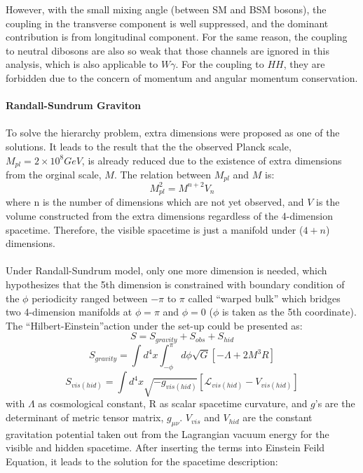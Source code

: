 However, with the small mixing angle (between SM and BSM bosons), the coupling in the transverse component is well suppressed, and the dominant contribution is from longitudinal component. For the same reason, the coupling to neutral dibosons are also so weak that those channels are ignored in this analysis, which is also applicable to $W\gamma$.  For the coupling to $HH$, they are forbidden due to the concern of momentum and angular momentum conservation. 
\\
\\{\bf Randall-Sundrum Graviton}
\\
\\To solve the hierarchy problem, extra dimensions were proposed as one of the solutions. It leads to the result that the the observed Planck scale, $M_{pl}=2\times10^8GeV$, is already reduced due to the existence of extra dimensions from the orginal scale, $M$. The relation between $M_{pl}$ and $M$ is: 
\begin{equation}
\label{Eq:planck_relation}
M_{pl}^{2} = M^{n+2}V_{n}
\end{equation}
where n is the number of dimensions which are not yet observed, and $V$ is the volume constructed from the extra dimensions regardless of the 4-dimension spacetime. Therefore, the visible spacetime is just a manifold under ($4+n$) dimensions.
\\ 
\\Under Randall-Sundrum model, only one more dimension is needed, which hypothesizes that the 5th dimension is constrained with boundary condition of the $\phi$ periodicity ranged between $-\pi$ to $\pi$ called ``warped bulk'' which bridges two 4-dimension manifolds at $\phi=\pi$  and $\phi=0$ ($\phi$ is taken as the 5th coordinate). The ``Hilbert-Einstein''action under the set-up could be presented as:
\begin{equation}
S = S_{gravity} +S_{obs} + S_{hid}
\end{equation}
\begin{equation}
S_{gravity} = \int d^4x \int^{\pi}_{-\phi}d\phi\sqrt{G}\left[-\Lambda +2M^3R\right]
\end{equation}
\begin{equation}
S_{vis(hid)} = \int d^4x\sqrt{-g_{vis(hid)}}\left[\mathcal{L}_{vis(hid)}-V_{vis(hid)}\right]
\end{equation}
with $\Lambda$ as cosmological constant, R as scalar spacetime curvature, and $g$'s are the determinant of metric tensor matrix,  $g_{\mu\nu}$. $V_{vis}$ and $V_{hid}$ are the constant gravitation potential taken out from the Lagrangian vacuum energy for the visible and hidden spacetime. After inserting the terms into Einstein Feild Equation, it leads to the solution for the spacetime description:
